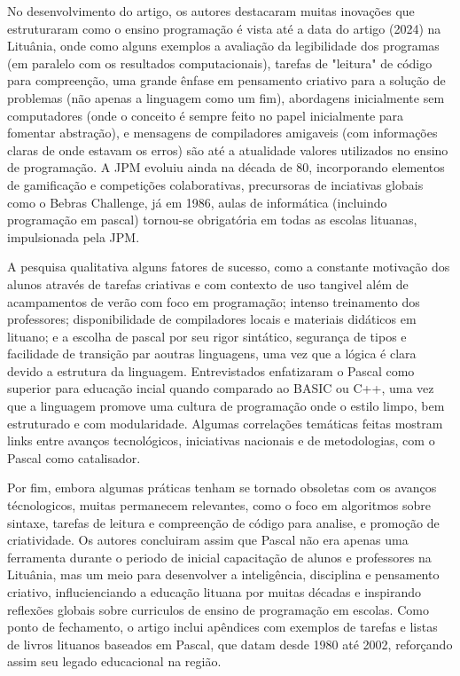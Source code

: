 \documentclass[12pt,a4paper,oneside]{abntex2}
\begin{document}
No desenvolvimento do artigo, os autores destacaram muitas inovações que estruturaram como o ensino programação é vista até a data do artigo (2024) na Lituânia, onde como alguns exemplos a avaliação da legibilidade dos programas (em paralelo com os resultados computacionais), tarefas de "leitura" de código para compreenção, uma grande ênfase em pensamento criativo para a solução de problemas (não apenas a linguagem como um fim), abordagens inicialmente sem computadores (onde o conceito é sempre feito no papel inicialmente para fomentar abstração), e mensagens de compiladores amigaveis (com informações claras de onde estavam os erros) são até a atualidade valores utilizados no ensino de programação. A JPM evoluiu ainda na década de 80, incorporando elementos de gamificação e competições colaborativas, precursoras de inciativas globais como o Bebras Challenge, já em 1986, aulas de informática (incluindo programação em pascal) tornou-se obrigatória em todas as escolas lituanas, impulsionada pela JPM.

A pesquisa qualitativa alguns fatores de sucesso, como a constante motivação dos alunos através de tarefas criativas e com contexto de uso tangivel além de acampamentos de verão com foco em programação; intenso treinamento dos professores; disponibilidade de compiladores locais e materiais didáticos em lituano; e a escolha de pascal por seu rigor sintático, segurança de tipos e facilidade de transição par aoutras linguagens, uma vez que a lógica é clara devido a estrutura da linguagem. Entrevistados enfatizaram o Pascal como superior para educação incial quando comparado ao BASIC ou C++, uma vez que a linguagem promove uma cultura de programação onde o estilo limpo, bem estruturado e com modularidade. Algumas correlações temáticas feitas mostram links entre avanços tecnológicos, iniciativas nacionais e de metodologias, com o Pascal como catalisador.

Por fim, embora algumas práticas tenham se tornado obsoletas com os avanços técnologicos, muitas permanecem relevantes, como o foco em algoritmos sobre sintaxe, tarefas de leitura e compreenção de código para analise, e promoção de criatividade. Os autores concluiram assim que Pascal não era apenas uma ferramenta durante o periodo de inicial capacitação de alunos e professores na Lituânia, mas um meio para desenvolver a inteligência, disciplina e pensamento criativo, influcienciando a educação lituana por muitas décadas e inspirando reflexões globais sobre curriculos de ensino de programação em escolas. Como ponto de fechamento, o artigo inclui apêndices com exemplos de tarefas e listas de livros lituanos baseados em Pascal, que datam desde 1980 até 2002, reforçando assim seu legado educacional na região.
\end{document}
